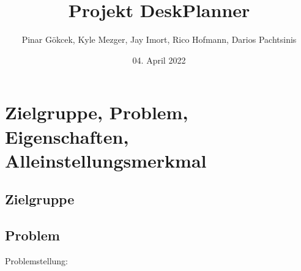 \documentclass{article}
\title{Projekt DeskPlanner}
\author{Pinar Gökcek, Kyle Mezger, Jay Imort, Rico Hofmann, Darios Pachtsinis}
\date{04. April 2022}
\begin{document}
\begin{titlepage}
    \centering
    \maketitle

    \thispagestyle{empty}

    \vfill

\end{titlepage}

\tableofcontents

\pagebreak

\section{Zielgruppe, Problem, Eigenschaften, Alleinstellungsmerkmal}

\subsection{Zielgruppe}

\subsection{Problem}
Problemstellung:
\end{document}
